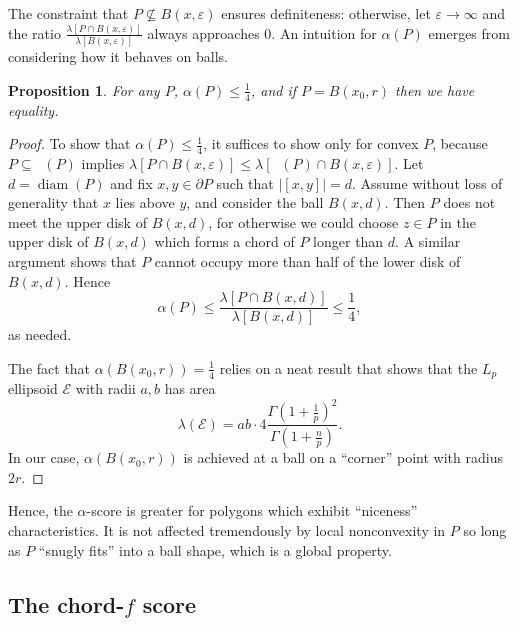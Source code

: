 \documentclass[draft]{jocg}
\newcommand{\EE}{\mathcal{E}}
\newcommand{\abs}[1]{|#1|}
\DeclareMathOperator{\diam}{\mathrm{diam}}
\DeclareMathOperator{\conv}{\mathcal{}}
\newtheorem{proposition}{Proposition}[section]
\theoremstyle{definition}
\theoremstyle{remark}
\begin{document}
The constraint that $P \not\subseteq B(x,\varepsilon)$ ensures definiteness:
otherwise, let $\varepsilon \to \infty$ and the ratio $\frac{\lambda[P \cap B(x,
\varepsilon)]}{\lambda[B(x, \varepsilon)]}$ always approaches $0$. An intuition
for $\alpha(P)$ emerges from considering how it behaves on balls.

\begin{proposition}
  For any $P$, $\alpha(P) \leq \frac{1}{4}$, and if $P = B(x_0, r)$
  then we have equality.
  \label{prop:alpha}
\end{proposition}

\begin{proof}
  To show that $\alpha(P) \leq \frac{1}{4}$, it suffices to show only for convex
  $P$, because $P \subseteq \conv(P)$ implies $\lambda[P \cap B(x, \varepsilon)]
  \leq \lambda[\conv(P) \cap B(x, \varepsilon)]$. Let $d = \diam (P)$ and fix
  $x,y \in \partial P$ such that $\abs{[x,y]} = d$. Assume without loss of
  generality that $x$ lies above $y$, and consider the ball $B(x, d)$. Then $P$
  does not meet the upper disk of $B(x,d)$, for otherwise we could choose $z \in
  P$ in the upper disk of $B(x,d)$ which forms a chord of $P$ longer than $d$.
  A similar argument shows that $P$ cannot occupy more than half of the lower
  disk of $B(x,d)$. Hence
  \begin{equation*}
    \alpha(P) \leq \frac{\lambda[P \cap B(x,d)]}{\lambda[B(x,d)]} \leq
    \frac{1}{4},
  \end{equation*}
  as needed.

  The fact that $\alpha(B(x_0, r)) = \frac{1}{4}$ relies on a neat
  result \cite{10.2307/30044198} that shows that the $L_p$
  ellipsoid $\EE$ with radii $a, b$ has area
  \begin{equation*}
    \lambda(\EE) = a b \cdot 4
    \frac{\Gamma(1+\frac{1}{p})^2}{\Gamma(1+\frac{n}{p})}.
  \end{equation*}
  In our case, $\alpha(B(x_0, r))$ is achieved at a ball on a ``corner'' point
  with radius $2r$.
\end{proof}

Hence, the $\alpha$-score is greater for polygons which exhibit ``niceness''
characteristics. It is not affected tremendously by local nonconvexity in $P$ so
long as $P$ ``snugly fits'' into a ball shape, which is a global property.

\subsection{The chord-$f$ score}
\end{document}
